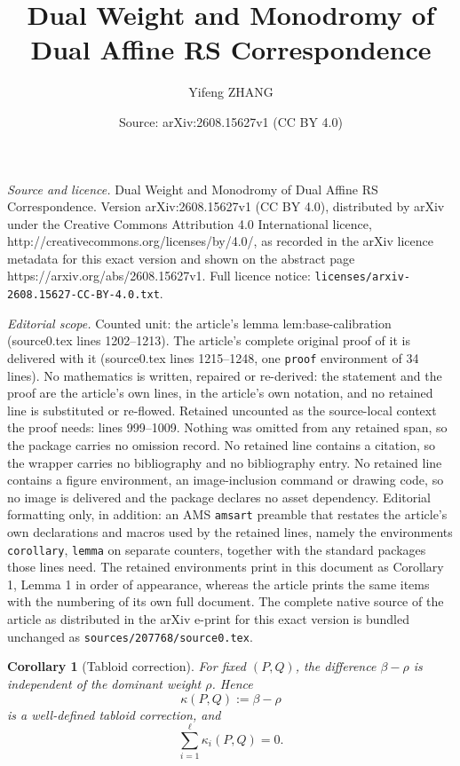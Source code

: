 \documentclass[10pt,a4paper]{amsart}
\title{Dual Weight and Monodromy of Dual Affine RS Correspondence}
\author{Yifeng ZHANG}
\date{Source: arXiv:2608.15627v1 (CC BY 4.0)}
\newtheorem{corollary}{Corollary}
\begin{document}
\maketitle

\noindent\emph{Source and licence.} Dual Weight and Monodromy of Dual Affine RS Correspondence. Version arXiv:2608.15627v1 (CC BY 4.0), distributed by arXiv under the Creative Commons Attribution 4.0 International licence, http://creativecommons.org/licenses/by/4.0/, as recorded in the arXiv licence metadata for this exact version and shown on the abstract page https://arxiv.org/abs/2608.15627v1. Full licence notice: \texttt{licenses/arxiv-2608.15627-CC-BY-4.0.txt}.\par\smallskip

\noindent\textit{Editorial scope.} Counted unit: the article's lemma lem:base-calibration (source0.tex lines 1202--1213). The article's complete original proof of it is delivered with it (source0.tex lines 1215--1248, one \texttt{proof} environment of 34 lines). No mathematics is written, repaired or re-derived: the statement and the proof are the article's own lines, in the article's own notation, and no retained line is substituted or re-flowed.  Retained uncounted as the source-local context the proof needs: lines 999--1009.  Nothing was omitted from any retained span, so the package carries no omission record.  No retained line contains a citation, so the wrapper carries no bibliography and no bibliography entry.  No retained line contains a figure environment, an image-inclusion command or drawing code, so no image is delivered and the package declares no asset dependency.  Editorial formatting only, in addition: an AMS \texttt{amsart} preamble that restates the article's own declarations and macros used by the retained lines, namely the environments \texttt{corollary}, \texttt{lemma} on separate counters, together with the standard packages those lines need.  The retained environments print in this document as Corollary 1, Lemma 1 in order of appearance, whereas the article prints the same items with the numbering of its own full document.  The complete native source of the article as distributed in the arXiv e-print for this exact version is bundled unchanged as \texttt{sources/207768/source0.tex}.
\begin{corollary}[Tabloid correction]\label{cor:kappa-independent}
For fixed \((P,Q)\), the difference \(\beta-\rho\) is independent of the dominant weight
\(\rho\).  Hence
\begin{equation}\label{eq:kappa}
                         \kappa(P,Q):=\beta-\rho
\end{equation}
is a well-defined tabloid correction, and
\begin{equation}\label{eq:kappa-sum}
                         \sum_{i=1}^{\ell}\kappa_i(P,Q)=0.
\end{equation}
\end{corollary}
\end{document}
